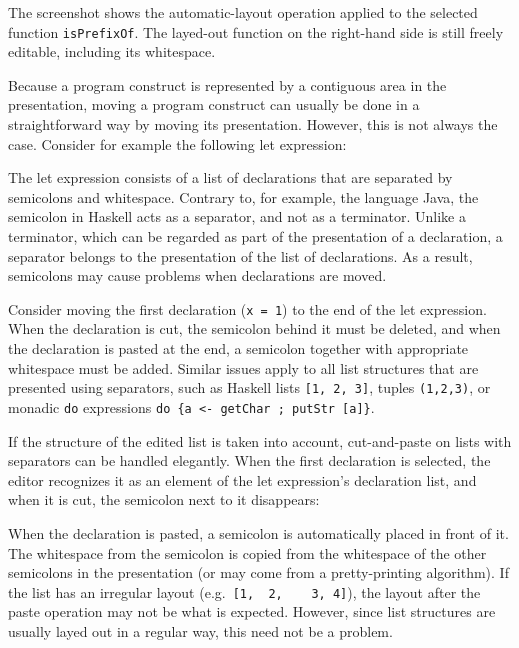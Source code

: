 The screenshot  shows the automatic-layout operation applied to the selected function {\tt isPrefixOf}. The layed-out function on the right-hand side is still freely editable, including its whitespace.


Because a program construct is represented by a contiguous area in the presentation, moving a program construct can usually be done in a straightforward way by moving its presentation. However, this is not always the case. Consider for example the following let expression:


The let expression consists of a list of declarations that are separated by semicolons and whitespace. Contrary to, for example, the language Java, the semicolon in Haskell acts as a separator, and not as a terminator. Unlike a terminator, which can be regarded as part of the presentation of a declaration, a separator belongs to the presentation of the list of declarations. As a result, semicolons may cause problems when declarations are moved.

Consider moving the first declaration (\verb|x = 1|) to the end of the let expression. When the declaration is cut, the semicolon behind it must be deleted, and when the declaration is pasted at the end, a semicolon together with appropriate whitespace must be added. Similar issues apply to all list structures that are presented using separators, such as Haskell lists \verb|[1, 2, 3]|, tuples \verb|(1,2,3)|, or monadic \verb|do| expressions \verb|do {a <- getChar ; putStr [a]}|.

If the structure of the edited list is taken into account, cut-and-paste on lists with separators can be handled elegantly. When the first declaration is selected, the editor recognizes it as an element of the let expression's declaration list, and when it is cut, the semicolon next to it disappears:


When the declaration is pasted, a semicolon is automatically placed in front of it. The whitespace from the semicolon is copied from the whitespace of the other semicolons in the presentation (or may come from a pretty-printing algorithm). If the list has an irregular layout (e.g.\ \verb|[1,  2,    3, 4]|), the layout after the paste operation may not be what is expected. However, since list structures are usually layed out in a regular way, this need not be a problem.

